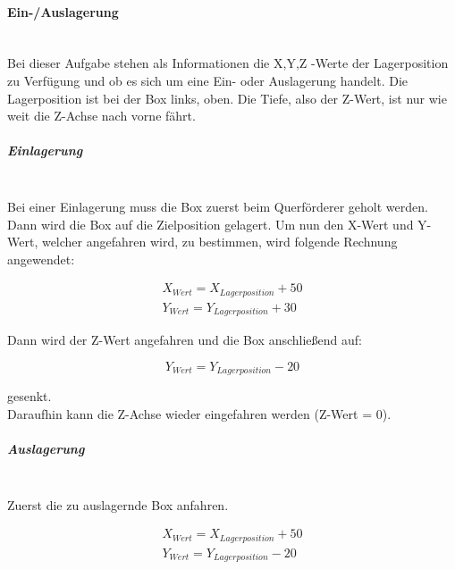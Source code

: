     \paragraph{Ein-/Auslagerung} \mbox{} \\
    Bei dieser Aufgabe stehen als Informationen die X,Y,Z -Werte der Lagerposition zu Verfügung und ob es sich um eine Ein- oder Auslagerung handelt. Die Lagerposition ist bei der Box links, oben. Die Tiefe, also der Z-Wert, ist nur wie weit die Z-Achse nach vorne fährt. 
    
    \subparagraph{Einlagerung} \mbox{} \\
    Bei einer Einlagerung muss die Box zuerst beim Querförderer geholt werden. Dann wird die Box auf die Zielposition gelagert. Um nun den X-Wert und Y-Wert, welcher angefahren wird, zu bestimmen, wird folgende Rechnung angewendet:

    \vspace{-6mm}

    \begin{equation*}
        \begin{split}
                X_{Wert} = X_{Lagerposition} + 50
                \\
                Y_{Wert} = Y_{Lagerposition} + 30  
        \end{split} 
    \end{equation*}

    Dann wird der Z-Wert angefahren und die Box anschließend auf:

    \vspace{-6mm}
    \begin{equation*}
        Y_{Wert} = Y_{Lagerposition} - 20
    \end{equation*}

    gesenkt. \\
    Daraufhin kann die Z-Achse wieder eingefahren werden (Z-Wert = 0). 

    \subparagraph{Auslagerung} \mbox{} \\
    Zuerst die zu auslagernde Box anfahren. 

    \vspace{-6mm}

    \begin{equation*}
        \begin{split}
                X_{Wert} = X_{Lagerposition} + 50
                \\
                Y_{Wert} = Y_{Lagerposition} - 20  
        \end{split} 
    \end{equation*}

